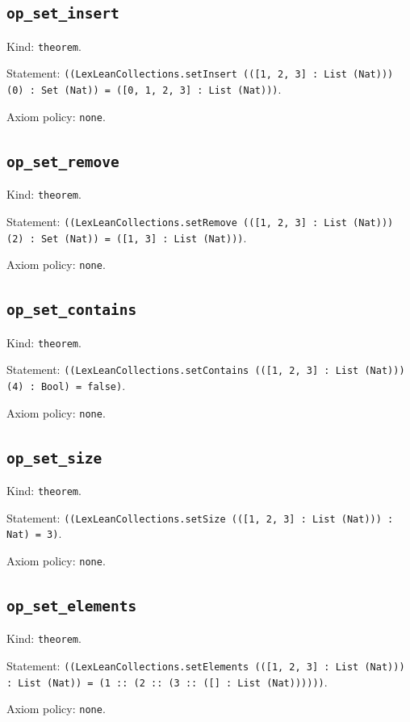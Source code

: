 \documentclass[11pt]{article}
\begin{document}
\subsection*{\texttt{op\_set\_insert}}
\noindent Kind: \texttt{theorem}.\par
\noindent Statement: \texttt{((LexLeanCollections.setInsert (([1, 2, 3] : List (Nat))) (0) : Set (Nat)) = ([0, 1, 2, 3] : List (Nat)))}.\par
\noindent Axiom policy: \texttt{none}.\par
\subsection*{\texttt{op\_set\_remove}}
\noindent Kind: \texttt{theorem}.\par
\noindent Statement: \texttt{((LexLeanCollections.setRemove (([1, 2, 3] : List (Nat))) (2) : Set (Nat)) = ([1, 3] : List (Nat)))}.\par
\noindent Axiom policy: \texttt{none}.\par
\subsection*{\texttt{op\_set\_contains}}
\noindent Kind: \texttt{theorem}.\par
\noindent Statement: \texttt{((LexLeanCollections.setContains (([1, 2, 3] : List (Nat))) (4) : Bool) = false)}.\par
\noindent Axiom policy: \texttt{none}.\par
\subsection*{\texttt{op\_set\_size}}
\noindent Kind: \texttt{theorem}.\par
\noindent Statement: \texttt{((LexLeanCollections.setSize (([1, 2, 3] : List (Nat))) : Nat) = 3)}.\par
\noindent Axiom policy: \texttt{none}.\par
\subsection*{\texttt{op\_set\_elements}}
\noindent Kind: \texttt{theorem}.\par
\noindent Statement: \texttt{((LexLeanCollections.setElements (([1, 2, 3] : List (Nat))) : List (Nat)) = (1 :: (2 :: (3 :: ([] : List (Nat))))))}.\par
\noindent Axiom policy: \texttt{none}.\par
\end{document}
